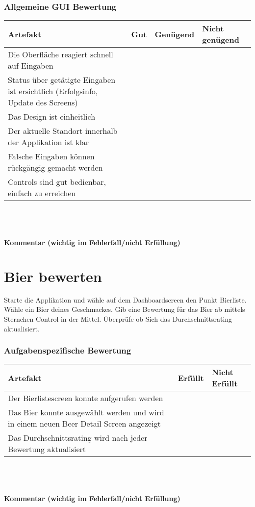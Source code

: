 \documentclass[10pt,a4paper]{scrartcl}
\begin{document}
\subsubsection*{Allgemeine GUI Bewertung}
\begin{tabular}{|p{}|p{}|p{}|p{}|}
\hline 
\rule[-1ex]{0pt}{2.5ex} \textbf{Artefakt} & \textbf{Gut} & \textbf{Genügend} & \textbf{Nicht genügend} \\ 
\hline 
\rule[-1ex]{0pt}{2.5ex} Die Oberfläche reagiert schnell auf Eingaben &  &  &  \\ 
\hline 
\rule[-1ex]{0pt}{2.5ex} Status über getätigte Eingaben ist ersichtlich (Erfolgsinfo, Update des Screens) &  &  &  \\ 
\hline 
\rule[-1ex]{0pt}{2.5ex} Das Design ist einheitlich &  &  &  \\ 
\hline 
\rule[-1ex]{0pt}{2.5ex} Der aktuelle Standort innerhalb der Applikation ist klar &  &  &  \\ 
\hline 
\rule[-1ex]{0pt}{2.5ex} Falsche Eingaben können rückgängig gemacht werden &  &  &  \\ 
\hline 
\rule[-1ex]{0pt}{2.5ex} Controls sind gut bedienbar, einfach zu erreichen &  &  &  \\  
\hline 
\end{tabular} 
\\
\\
\\
\textbf{Kommentar (wichtig im Fehlerfall/nicht Erfüllung)}
\vspace*{3cm}

\section{Bier bewerten}
Starte die Applikation und wähle auf dem Dashboardscreen den Punkt Bierliste. Wähle ein Bier deines Geschmackes. Gib eine Bewertung für das Bier ab mittels Sternchen Control in der Mittel. Überprüfe ob Sich das Durchschnittsrating aktualisiert.

\subsubsection*{Aufgabenspezifische Bewertung}
\begin{tabular}{|p{}|p{}|p{}|}
\hline 
\textbf{Artefakt} & \textbf{Erfüllt} & \textbf{Nicht Erfüllt} \\ 
\hline 
Der Bierlistescreen konnte aufgerufen werden &  &  \\ 
\hline 
Das Bier konnte ausgewählt werden und wird in einem neuen Beer Detail Screen angezeigt &  &  \\ 
\hline 
Das Durchschnittsrating wird nach jeder Bewertung aktualisiert &  &  \\ 
\hline 
\end{tabular}
\\
\\
\\
\textbf{Kommentar (wichtig im Fehlerfall/nicht Erfüllung)}
\vspace*{3cm}
\end{document}
